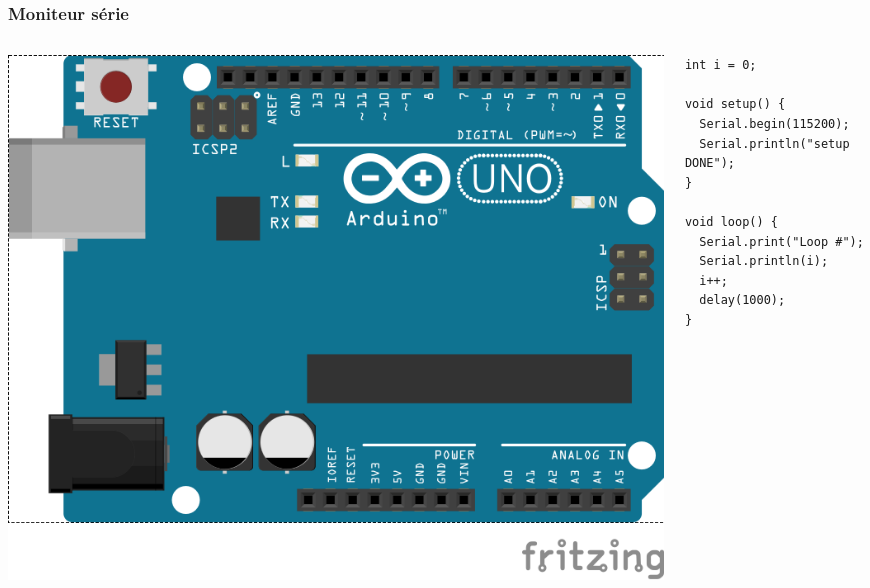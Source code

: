 \documentclass[aspectratio=169,utf8,french]{beamer}
\begin{document}
\begin{frame}[fragile]
  \frametitle{Moniteur série}
  \begin{columns}
    \begin{column}{.5\linewidth}
      \includegraphics[width=\linewidth]{pictures/UNO_bb.png}
    \end{column}
    \pause
    \begin{column}{.5\linewidth}
      \begin{lstlisting}
int i = 0;

void setup() {
  Serial.begin(115200);
  Serial.println("setup DONE");
}

void loop() {
  Serial.print("Loop #");
  Serial.println(i);
  i++;
  delay(1000);
}
      \end{lstlisting}
    \end{column}
  \end{columns}
\end{frame}
\end{document}
